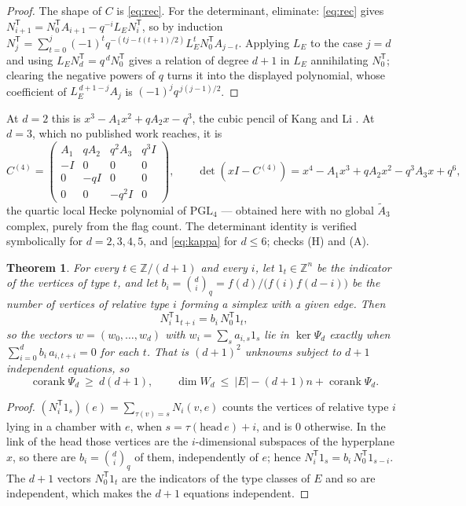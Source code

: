 \documentclass[11pt]{amsart}
\theoremstyle{plain}
\newtheorem{theorem}{Theorem}
\theoremstyle{definition}
\theoremstyle{remark}
\newcommand{\Z}{\mathbb{Z}}
\newcommand{\LE}{L_E}
\newcommand{\Atilde}[1]{\widetilde A_{#1}}
\newcommand{\tp}{\mathsf{T}}
\begin{document}
\begin{proof}
The shape of $C$ is \eqref{eq:rec}. For the determinant, eliminate: \eqref{eq:rec} gives
$N_{i+1}^{\tp}=N_0^{\tp}A_{i+1}-q^{-i}\LE N_i^{\tp}$, so by induction
$N_j^{\tp}=\sum_{t=0}^{j}(-1)^{t}q^{-(tj-t(t+1)/2)}\LE^{t}N_0^{\tp}A_{j-t}$. Applying $\LE$
to the case $j=d$ and using $\LE N_d^{\tp}=q^{\,d}N_0^{\tp}$ gives a relation of degree
$d+1$ in $\LE$ annihilating $N_0^{\tp}$; clearing the negative powers of $q$ turns it into
the displayed polynomial, whose coefficient of $\LE^{\,d+1-j}A_j$ is
$(-1)^{j}q^{\,j(j-1)/2}$.
\end{proof}

At $d=2$ this is $x^{3}-A_1x^{2}+qA_2x-q^{3}$, the cubic pencil of Kang and Li \cite{KL14}.
At $d=3$, which no published work reaches, it is
\[
  C^{(4)}=\begin{pmatrix} A_1 & qA_2 & q^{2}A_3 & q^{3}I\\ -I&0&0&0\\ 0&-qI&0&0\\
          0&0&-q^{2}I&0\end{pmatrix},
  \qquad
  \det(xI-C^{(4)})=x^{4}-A_1x^{3}+qA_2x^{2}-q^{3}A_3x+q^{6} ,
\]
the quartic local Hecke polynomial of $\mathrm{PGL}_4$ --- obtained here with no global
$\Atilde3$ complex, purely from the flag count. The determinant identity is verified
symbolically for $d=2,3,4,5$, and \eqref{eq:kappa} for $d\le6$; checks (H) and (A).

\begin{theorem}\label{thm:corank}
For every $t\in\Z/(d+1)$ and every $i$, let $1_t\in\Z^{n}$ be the indicator of the vertices
of type $t$, and let $b_i=\binom{d}{i}_{\!q}=f(d)/\bigl(f(i)f(d-i)\bigr)$ be the number of
vertices of relative type $i$ forming a simplex with a given edge. Then
\[
  N_i^{\tp}1_{t+i}=b_i\,N_0^{\tp}1_{t},
\]
so the vectors $w=(w_0,\dots,w_d)$ with $w_i=\sum_s a_{i,s}1_s$ lie in $\ker\Psi_d$ exactly
when $\sum_{i=0}^{d}b_i\,a_{i,t+i}=0$ for each $t$. That is $(d+1)^{2}$ unknowns subject to
$d+1$ independent equations, so
\[
  \operatorname{corank}\Psi_d\ \ge\ d(d+1),
  \qquad
  \dim W_d\ \le\ |E|-(d+1)n+\operatorname{corank}\Psi_d .
\]
\end{theorem}

\begin{proof}
$(N_i^{\tp}1_s)(e)=\sum_{\tau(v)=s}N_i(v,e)$ counts the vertices of relative type $i$ lying
in a chamber with $e$, when $s=\tau(\mathrm{head}\,e)+i$, and is $0$ otherwise. In the link
of the head those vertices are the $i$-dimensional subspaces of the hyperplane $x$, so there
are $b_i=\binom{d}{i}_q$ of them, independently of $e$; hence
$N_i^{\tp}1_s=b_i\,N_0^{\tp}1_{s-i}$.
The $d+1$ vectors $N_0^{\tp}1_t$ are the indicators of the type classes of $E$ and so are
independent, which makes the $d+1$ equations independent.
\end{proof}
\end{document}
